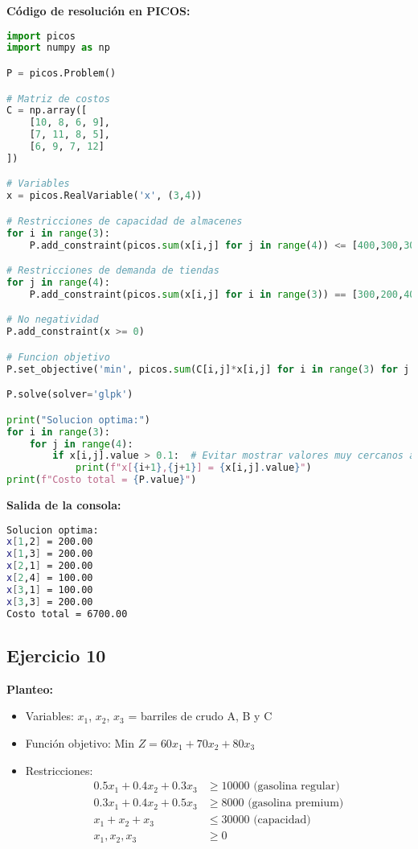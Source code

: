 \documentclass[12pt]{article}
\begin{document}
\textbf{Código de resolución en PICOS:}
\begin{lstlisting}[language=Python]
import picos
import numpy as np

P = picos.Problem()

# Matriz de costos
C = np.array([
    [10, 8, 6, 9],
    [7, 11, 8, 5],
    [6, 9, 7, 12]
])

# Variables
x = picos.RealVariable('x', (3,4))

# Restricciones de capacidad de almacenes
for i in range(3):
    P.add_constraint(picos.sum(x[i,j] for j in range(4)) <= [400,300,300][i])

# Restricciones de demanda de tiendas
for j in range(4):
    P.add_constraint(picos.sum(x[i,j] for i in range(3)) == [300,200,400,100][j])

# No negatividad
P.add_constraint(x >= 0)

# Funcion objetivo
P.set_objective('min', picos.sum(C[i,j]*x[i,j] for i in range(3) for j in range(4)))

P.solve(solver='glpk')

print("Solucion optima:")
for i in range(3):
    for j in range(4):
        if x[i,j].value > 0.1:  # Evitar mostrar valores muy cercanos a cero
            print(f"x[{i+1},{j+1}] = {x[i,j].value}")
print(f"Costo total = {P.value}")
\end{lstlisting}

\textbf{Salida de la consola:}
\begin{lstlisting}[language=bash,backgroundcolor=\color{black},basicstyle=\color{white}\ttfamily,numbers=none]
Solucion optima:
x[1,2] = 200.00
x[1,3] = 200.00
x[2,1] = 200.00
x[2,4] = 100.00
x[3,1] = 100.00
x[3,3] = 200.00
Costo total = 6700.00
\end{lstlisting}

\subsection{Ejercicio 10}

\textbf{Planteo:}
\begin{itemize}
\item Variables: $x_1$, $x_2$, $x_3$ = barriles de crudo A, B y C
\item Función objetivo: Min $Z = 60x_1 + 70x_2 + 80x_3$
\item Restricciones:
  \begin{align*}
  0.5x_1 + 0.4x_2 + 0.3x_3 &\geq 10000 \text{ (gasolina regular)} \\
  0.3x_1 + 0.4x_2 + 0.5x_3 &\geq 8000 \text{ (gasolina premium)} \\
  x_1 + x_2 + x_3 &\leq 30000 \text{ (capacidad)} \\
  x_1, x_2, x_3 &\geq 0
  \end{align*}
\end{itemize}
\end{document}
